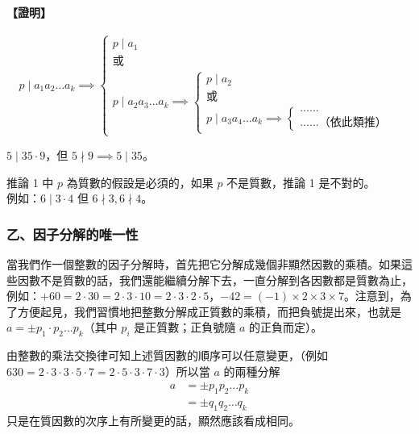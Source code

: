 \paragraph{【證明】}
\begin{equation*}
  p \mid a_1 a_2 \dots a_k \implies \begin{cases}
    p \mid a_1 \\
    \text{或} \\
    p \mid a_2 a_3 \dots a_k \implies \begin{cases}
      p \mid a_2 \\
      \text{或} \\
      p \mid a_3 a_4 \dots a_k \implies \begin{cases}
        \dots\dots \\
        \dots\dots \text{（依此類推）}
      \end{cases}
    \end{cases}
  \end{cases}
\end{equation*}

\begin{example}\label{ex:6-3-1}
$5 \mid 35 \cdot 9$，但 $5 \nmid 9 \implies 5 \mid 35$。
\end{example}

\begin{example}\label{ex:6-3-2}
推論 1 中 $p$ 為質數的假設是必須的，如果 $p$ 不是質數，推論 1 是不對的。\\
例如：$6 \mid 3 \cdot 4$ 但 $6 \nmid 3, 6 \nmid 4$。
\end{example}

\subsubsection*{乙、因子分解的唯一性}\label{subsec:6-3-b}

當我們作一個整數的因子分解時，首先把它分解成幾個非顯然因數的乘積。如果這些因數不是質數的話，我們還能繼續分解下去，一直分解到各因數都是質數為止，例如：$+60 = 2 \cdot 30 = 2 \cdot 3 \cdot 10 = 2 \cdot 3 \cdot 2 \cdot 5$，$-42 = (-1) \times 2 \times 3 \times 7$。注意到，為了方便起見，我們習慣地把整數分解成正質數的乘積，而把負號提出來，也就是 $a = \pm p_1 \cdot p_2 \dots p_k$（其中 $p_i$ 是正質數；正負號隨 $a$ 的正負而定）。

由整數的乘法交換律可知上述質因數的順序可以任意變更，（例如 $630 = 2 \cdot 3 \cdot 3 \cdot 5 \cdot 7 = 2 \cdot 5 \cdot 3 \cdot 7 \cdot 3$）所以當 $a$ 的兩種分解
\begin{align*}
  a &= \pm p_1 p_2 \dots p_k \\
    &= \pm q_1 q_2 \dots q_k
\end{align*}
只是在質因數的次序上有所變更的話，顯然應該看成相同。

